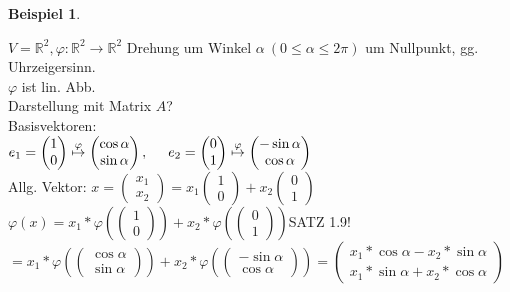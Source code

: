 \documentclass[a4paper,11pt]{article}
\newtheorem{bsp}[definition]{Beispiel}
\newcommand{\hsp}{\hspace{5mm}}
\begin{document}
\begin{bsp}
\end{bsp}
$V=\mathbb{R}^2,\varphi\colon\mathbb{R}^2\rightarrow\mathbb{R}^2$ Drehung um Winkel $\alpha\:(0\leq\alpha\leq 2\pi)$ um Nullpunkt, gg. Uhrzeigersinn. \\
$\varphi$ ist lin. Abb. \\
Darstellung mit Matrix $A$? \\
Basisvektoren: \\
$e_1=\begin{pmatrix}1 \\ 0\end{pmatrix}\overset{\varphi}{\mapsto}\begin{pmatrix}\cos\alpha \\ \sin\alpha\end{pmatrix},\hsp e_2=\begin{pmatrix}0 \\ 1\end{pmatrix}\overset{\varphi}{\mapsto}\begin{pmatrix}-\sin\alpha \\ \cos\alpha\end{pmatrix}$ \\
Allg. Vektor: $x=\begin{pmatrix}x_1 \\ x_2\end{pmatrix}=x_1\begin{pmatrix}1 \\ 0\end{pmatrix}+x_2\begin{pmatrix}0 \\ 1\end{pmatrix}$ \\
$\varphi(x)=x_1*\varphi\left(\begin{pmatrix}1 \\ 0\end{pmatrix}\right)+x_2*\varphi\left(\begin{pmatrix}0 \\ 1\end{pmatrix}\right)$\hsp SATZ 1.9! \\
$=x_1*\varphi\left(\begin{pmatrix}\cos\alpha \\ \sin\alpha\end{pmatrix}\right)+x_2*\varphi\left(\begin{pmatrix}-\sin\alpha \\ \cos\alpha\end{pmatrix}\right)=\begin{pmatrix}x_1*\cos\alpha-x_2*\sin\alpha \\ x_1*\sin\alpha+x_2*\cos\alpha\end{pmatrix}$ \\
\end{document}
